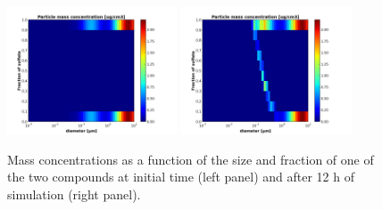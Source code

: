 \documentclass[a4paper,11pt]{article}
\begin{document}
\begin{figure}[H]
        \begin{center}
                \includegraphics[angle=0,width=0.45\textwidth]{../graph/figure_ref/cond_mass_ext_init.png}
                \includegraphics[angle=0,width=0.45\textwidth]{../graph/figure_ref/cond_mass_ext_out.png}
        \end{center}
\caption{Mass concentrations as a function of the size and fraction of one of the
two compounds at initial time (left panel) and after 12 h of simulation (right panel).}
\label{fig-cond-extb}
\end{figure}
 

\bigskip




\end{document}
